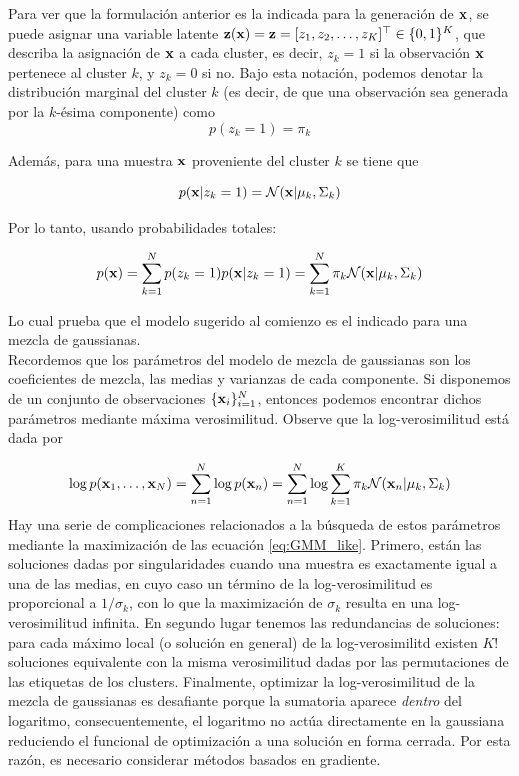 Para ver que la formulación anterior es la indicada para la generación de $\mathbf{x}$, se puede asignar una variable latente $\mathbf{z}(\mathbf{x}) = \mathbf{z} = [z_1,z_2,\ldots,z_K]^\top\in\{0,1\}^K$, que describa la asignación de $\mathbf{x}$ a cada cluster, es decir, $z_{k}=1$ si la observación $\mathbf{x}$ pertenece al cluster $k$, y $z_{k}=0$ si no. Bajo esta notación, podemos denotar la distribución marginal del cluster $k$ (es decir, de que una observación sea generada por la $k$-ésima componente) como 
\begin{equation}
 	p(z_k=1) = \pi_k \label{eq:GMM_marg1}
\end{equation} 

Además, para una muestra $\mathbf{x}$ proveniente del cluster $k$ se tiene que

\begin{equation}
	p(\mathbf{x}|z_k=1) = {\mathcal N}(\mathbf{x}|\mu_k,\Sigma_k)
\end{equation}

Por lo tanto, usando probabilidades totales:

\begin{equation}
	p(\mathbf{x})=\sum_{k=1}^N p(z_k=1) p(\mathbf{x}|z_k=1) = \sum_{k=1}^N \pi_k {\mathcal N}(\mathbf{x}|\mu_k,\Sigma_k)
\end{equation}

Lo cual prueba que el modelo sugerido al comienzo es el indicado para una mezcla de gaussianas.\\

Recordemos que los parámetros del modelo de mezcla de gaussianas son los coeficientes de mezcla, las medias y varianzas de cada componente. Si disponemos de un conjunto de observaciones $\{\mathbf{x}_i\}_{i=1}^N$, entonces podemos encontrar dichos parámetros mediante máxima verosimilitud. Observe que la log-verosimilitud está dada por 

\begin{equation}
	\log p(\mathbf{x}_1,\ldots,\mathbf{x}_N) = \sum_{n=1}^N \log p(\mathbf{x}_n) = \sum_{n=1}^N \log \sum_{k=1}^K  \pi_k{\mathcal N}(\mathbf{x}_n|\mu_k,\Sigma_k) \label{eq:GMM_like}	
\end{equation}
Hay una serie de complicaciones relacionados a la búsqueda de estos parámetros mediante la maximización de las ecuación \eqref{eq:GMM_like}. Primero, están las soluciones dadas por singularidades cuando una muestra es exactamente igual a una de las medias, en cuyo caso un término de la log-verosimilitud es proporcional a $1/\sigma_k$, con lo que la maximización de $\sigma_k$ resulta en una log-verosimilitud infinita. En segundo lugar tenemos las redundancias de soluciones: para cada máximo local (o solución en general) de la log-verosimilitd existen $K!$ soluciones equivalente con la misma verosimilitud dadas por las permutaciones de las etiquetas de los clusters. Finalmente, optimizar la log-verosimilitud de la mezcla de gaussianas es desafiante porque la sumatoria aparece \emph{dentro} del logaritmo, consecuentemente,  el logaritmo no actúa directamente en la gaussiana reduciendo el funcional de optimización a una solución en forma cerrada. Por esta razón, es necesario considerar métodos basados en gradiente.


